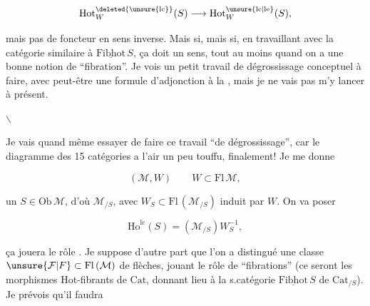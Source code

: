 
\[
\mathrm{Hot}^{\deleted{\unsure{\mathrm{lc}}}}_W(S)\longrightarrow\mathrm{Hot}^{\unsure{\mathrm{lc}|\mathrm{le}}}_W(S),
\]

mais pas de foncteur en sens inverse. Mais si, mais si,  en travaillant avec la catégorie similaire  à $\underline{\mathrm{Fibhot}}\,S$, ça doit  un sens, tout au moins quand on a une bonne notion de ``fibration''. Je vois un petit travail de dégrossissage conceptuel à faire, avec peut-être une formule d'adjonction à la , mais je ne vais pas m'y lancer à présent.

$\backslash$


Je vais quand même essayer de faire ce travail ``de dégrossissage'', car le diagramme des 15 catégories a l'air un peu touffu, finalement! Je me donne

\[
(\mathcal M,W)\qquad W\subset\mathrm{Fl}\,\mathcal M,
\]

un $S\in\mathrm{Ob}\,\mathcal M$, d'où $\mathcal M_{/S}$, avec $W_S\subset\mathrm{Fl}\,(\mathcal M_{/S})$ induit par $W$. On va poser

\[
\mathrm{Ho}^{\mathrm{lc}}(S)=(\mathcal M_{/S})W_S^{-1},
\]

ça jouera le rôle . Je suppose d'autre part que l'on a distingué une classe $\unsure{\mathcal F|F}\subset\mathrm{Fl}\,(\mathcal M)$ de flèches, jouant le rôle de ``fibrations'' (ce seront les morphismes Hot-fibrants de $\mathrm{Cat}$, donnant lieu à la s.catégorie $\underline{\mathrm{Fibhot}}\,S$ de $\mathrm{Cat}_{/S}$). Je prévois qu'il faudra

